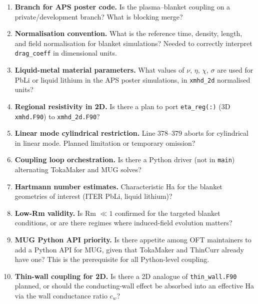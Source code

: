 \documentclass[11pt,letterpaper]{article}
\begin{document}
\begin{enumerate}[label=\textbf{Q\arabic*.}]
  \item \textbf{Branch for APS poster code.}  Is the plasma--blanket coupling
    on a private/development branch?  What is blocking merge?

  \item \textbf{Normalisation convention.}  What is the reference time, density,
    length, and field normalisation for blanket simulations?
    Needed to correctly interpret \texttt{drag\_coeff} in dimensional units.

  \item \textbf{Liquid-metal material parameters.}  What values of $\nu$, $\eta$,
    $\chi$, $\sigma$ are used for PbLi or liquid lithium in the APS poster
    simulations, in \texttt{xmhd\_2d} normalised units?

  \item \textbf{Regional resistivity in 2D.}  Is there a plan to port
    \texttt{eta\_reg(:)} (3D \texttt{xmhd.F90}) to \texttt{xmhd\_2d.F90}?

  \item \textbf{Linear mode cylindrical restriction.}  Line 378--379 aborts
    for cylindrical in linear mode.  Planned limitation or temporary omission?

  \item \textbf{Coupling loop orchestration.}  Is there a Python driver (not in
    \texttt{main}) alternating TokaMaker and MUG solves?

  \item \textbf{Hartmann number estimates.}  Characteristic Ha for the blanket
    geometries of interest (ITER PbLi, liquid lithium)?

  \item \textbf{Low-Rm validity.}  Is Rm $\ll 1$ confirmed for the targeted
    blanket conditions, or are there regimes where induced-field evolution
    matters?

  \item \textbf{MUG Python API priority.}  Is there appetite among OFT
    maintainers to add a Python API for MUG, given that TokaMaker and ThinCurr
    already have one?  This is the prerequisite for all Python-level coupling.

  \item \textbf{Thin-wall coupling for 2D.}  Is there a 2D analogue of
    \texttt{thin\_wall.F90} planned, or should the conducting-wall effect be
    absorbed into an effective Ha via the wall conductance ratio $c_w$?
\end{enumerate}
\end{document}
